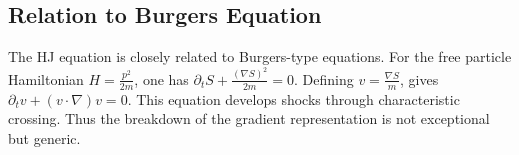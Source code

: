 \subsection{Relation to Burgers Equation}

The HJ equation is closely related to Burgers-type equations.
For the free particle Hamiltonian $H=\frac{p^2}{2m}$,
one has $\partial_t S + \frac{(\nabla S)^2}{2m}=0$.
Defining $v=\frac{\nabla S}{m}$, gives $\partial_t v + (v\cdot\nabla)v=0$.
This equation develops shocks through characteristic crossing. Thus the
breakdown of the gradient representation is not exceptional but generic.

